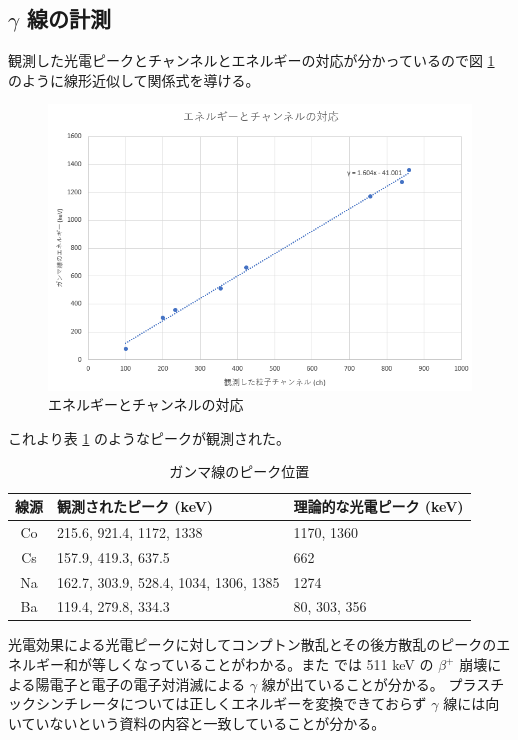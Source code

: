 \documentclass[uplatex,dvipdfmx,a4paper,11pt]{jlreq}
\numberwithin{equation}{section}
\theoremstyle{definition}
\begin{document}
\subsection{$\gamma$ 線の計測}
観測した光電ピークとチャンネルとエネルギーの対応が分かっているので図 \ref{fig:energy ch} のように線形近似して関係式を導ける。
\begin{figure}[htbp]
  \centering
  \includegraphics[width=14cm]{./assets/gamma_energy_ch.png}
  \caption{エネルギーとチャンネルの対応}
  \label{fig:energy ch}
\end{figure}

これより表 \ref{table:peak} のようなピークが観測された。
\begin{table}
  \centering
  \begin{tabular}{|c|lp{5cm}|}
    \hline
    線源 & 観測されたピーク (keV)                        & 理論的な光電ピーク (keV) \\
    \hline \hline
    Co & 215.6, 921.4, 1172, 1338              & 1170, 1360      \\
    Cs & 157.9, 419.3, 637.5                   & 662             \\
    Na & 162.7, 303.9, 528.4, 1034, 1306, 1385 & 1274            \\
    Ba & 119.4, 279.8, 334.3                   & 80, 303, 356    \\
    \hline
  \end{tabular}
  \caption{ガンマ線のピーク位置}
  \label{table:peak}
\end{table}

光電効果による光電ピークに対してコンプトン散乱とその後方散乱のピークのエネルギー和が等しくなっていることがわかる。また  では 511 \si{keV} の $\beta^+$ 崩壊による陽電子と電子の電子対消滅による $\gamma$ 線が出ていることが分かる。
プラスチックシンチレータについては正しくエネルギーを変換できておらず $\gamma$ 線には向いていないという資料の内容と一致していることが分かる。
\end{document}
